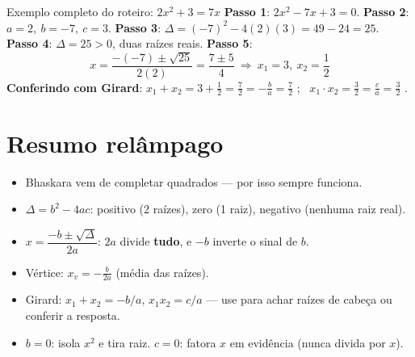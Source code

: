 \documentclass[12pt,a4paper]{article}
\begin{document}
\begin{exemplo}{Exemplo completo do roteiro: $2x^2+3=7x$}
\textbf{Passo 1}: $2x^2-7x+3=0$.
\textbf{Passo 2}: $a=2,\ b=-7,\ c=3$.
\textbf{Passo 3}: $\Delta = (-7)^2-4(2)(3) = 49-24=25$.
\textbf{Passo 4}: $\Delta=25>0$, duas raízes reais.
\textbf{Passo 5}:
\[
x = \frac{-(-7)\pm\sqrt{25}}{2(2)} = \frac{7\pm5}{4} \ \Rightarrow\ x_1=3,\ x_2=\frac12
\]
\textbf{Conferindo com Girard}: $x_1+x_2 = 3+\frac12=\frac72 = -\frac{b}{a}=\frac{7}{2}$ \checkmark;
\ $x_1\cdot x_2 = \frac32 = \frac{c}{a}=\frac32$ \checkmark.
\end{exemplo}

\section*{Resumo relâmpago}
\begin{itemize}[nosep]
  \item Bhaskara vem de completar quadrados — por isso sempre funciona.
  \item $\Delta=b^2-4ac$: positivo (2 raízes), zero (1 raiz), negativo (nenhuma raiz real).
  \item $x=\dfrac{-b\pm\sqrt\Delta}{2a}$: $2a$ divide \textbf{tudo}, e $-b$ inverte o sinal de $b$.
  \item Vértice: $x_v=-\frac{b}{2a}$ (média das raízes).
  \item Girard: $x_1+x_2=-b/a$, $x_1x_2=c/a$ — use para achar raízes de cabeça ou conferir a resposta.
  \item $b=0$: isola $x^2$ e tira raiz. $c=0$: fatora $x$ em evidência (nunca divida por $x$).
\end{itemize}
\end{document}

